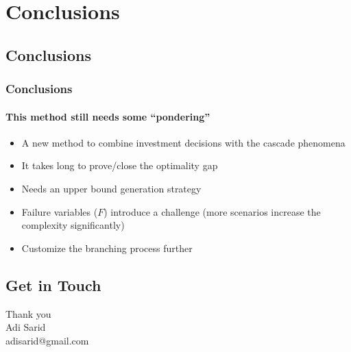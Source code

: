 \documentclass{beamer}
\begin{document}

\section{Conclusions}
\subsection{Conclusions}
\begin{frame}
\frametitle{Conclusions}
\framesubtitle{This method still needs some ``pondering''}
\begin{itemize}
  \item A new method to combine investment decisions with the cascade phenomena
	\item It takes long to prove/close the optimality gap
	\item Needs an upper bound generation strategy
	\item Failure variables ($F$) introduce a challenge (more scenarios increase the complexity significantly)
	\item Customize the branching process further
\end{itemize}
\end{frame}

\subsection{Get in Touch}
\begin{frame}
\LARGE Thank you\\
\vspace{2.5cm}
\normalsize
Adi Sarid\\
adisarid@gmail.com
\end{frame}
\end{document}
